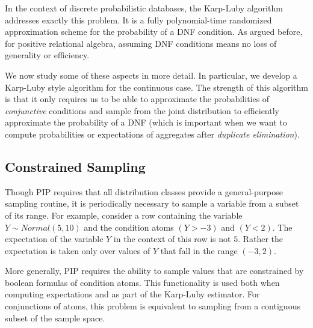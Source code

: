 In the context of discrete probabilistic databases, the Karp-Luby algorithm
addresses exactly this problem. It is a fully polynomial-time randomized
approximation scheme for the probability of a DNF condition. As argued
before, for positive relational algebra, assuming DNF conditions means no loss
of generality or efficiency.







\medskip

We now study some of these aspects in more detail.
In particular, we develop a Karp-Luby style algorithm for the continuous case.
The strength of this algorithm is that it only requires us to be able to approximate the probabilities of {\em conjunctive}\/ conditions and sample from the
joint distribution to efficiently approximate the probability of a DNF
(which is important when we want to compute probabilities or
expectations of aggregates after {\em duplicate elimination}\/).



\subsection{Constrained Sampling}
\label{subsec:csampling}


Though  PIP   requires  that   all  distribution  classes   provide  a
general-purpose  sampling  routine, it  is  periodically necessary  to
sample a variable from a subset of its range.  For example, consider a
row  containing  the variable  $Y \sim Normal(5,10)$  and the  condition
atoms $(Y >  -3)$ and $(Y < 2)$.  The expectation  of the variable $Y$
in the  context of  this row  is not $5$.   Rather the  expectation is
taken only over values of $Y$ that fall in the range $(-3,2)$.

More generally,  PIP requires  the ability to  sample values  that are
constrained   by   boolean   formulas   of  condition   atoms.    This
functionality is used both when  computing expectations and as part of
the Karp-Luby  estimator.  For conjunctions of atoms,  this problem is
equivalent to sampling  from a contiguous subset of  the sample space.

